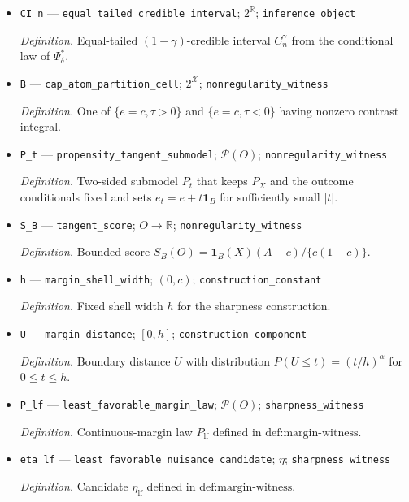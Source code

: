 \documentclass{article}
\begin{document}
\begin{itemize}
  \item \texttt{CI\_\allowbreak{}n} --- \texttt{equal\_\allowbreak{}tailed\_\allowbreak{}credible\_\allowbreak{}interval}; \(2^{\mathbb R}\); \texttt{inference\_\allowbreak{}object}
  \par\smallskip\noindent\emph{Definition.} Equal-tailed \((1-\gamma)\)-credible interval \(C_n^\gamma\) from the conditional law of \(\Psi_\delta^*\).
  \item \texttt{B} --- \texttt{cap\_\allowbreak{}atom\_\allowbreak{}partition\_\allowbreak{}cell}; \(2^{\mathcal X}\); \texttt{nonregularity\_\allowbreak{}witness}
  \par\smallskip\noindent\emph{Definition.} One of \(\{e=c,\tau>0\}\) and \(\{e=c,\tau<0\}\) having nonzero contrast integral.
  \item \texttt{P\_\allowbreak{}t} --- \texttt{propensity\_\allowbreak{}tangent\_\allowbreak{}submodel}; \(\mathcal P(O)\); \texttt{nonregularity\_\allowbreak{}witness}
  \par\smallskip\noindent\emph{Definition.} Two-sided submodel \(P_t\) that keeps \(P_X\) and the outcome conditionals fixed and sets \(e_t=e+t\mathbf 1_B\) for sufficiently small \(|t|\).
  \item \texttt{S\_\allowbreak{}B} --- \texttt{tangent\_\allowbreak{}score}; \(O\to\mathbb R\); \texttt{nonregularity\_\allowbreak{}witness}
  \par\smallskip\noindent\emph{Definition.} Bounded score \(S_B(O)=\mathbf 1_B(X)(A-c)/\{c(1-c)\}\).
  \item \texttt{h} --- \texttt{margin\_\allowbreak{}shell\_\allowbreak{}width}; \((0,c)\); \texttt{construction\_\allowbreak{}constant}
  \par\smallskip\noindent\emph{Definition.} Fixed shell width \(h\) for the sharpness construction.
  \item \texttt{U} --- \texttt{margin\_\allowbreak{}distance}; \([0,h]\); \texttt{construction\_\allowbreak{}component}
  \par\smallskip\noindent\emph{Definition.} Boundary distance \(U\) with distribution \(P(U\le t)=(t/h)^\alpha\) for \(0\le t\le h\).
  \item \texttt{P\_\allowbreak{}lf} --- \texttt{least\_\allowbreak{}favorable\_\allowbreak{}margin\_\allowbreak{}law}; \(\mathcal P(O)\); \texttt{sharpness\_\allowbreak{}witness}
  \par\smallskip\noindent\emph{Definition.} Continuous-margin law \(P_{\mathrm{lf}}\) defined in \(\text{def:margin-witness}\).
  \item \texttt{eta\_\allowbreak{}lf} --- \texttt{least\_\allowbreak{}favorable\_\allowbreak{}nuisance\_\allowbreak{}candidate}; \(\eta\); \texttt{sharpness\_\allowbreak{}witness}
  \par\smallskip\noindent\emph{Definition.} Candidate \(\eta_{\mathrm{lf}}\) defined in \(\text{def:margin-witness}\).
\end{itemize}
\end{document}
